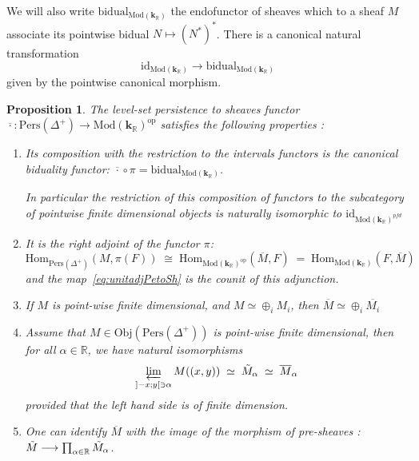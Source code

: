 \documentclass[a4paper, english, 11pt]{article}
\newcommand{\kk}[0]{\textbf{k}}
\newcommand{\Mod}[0]{\text{Mod}}
\newcommand{\Pe}{\text{Pers}}
\newcommand{\0}{\vec{0}}
\newcommand{\R}[0]{\mathbb{R}}
\newcommand{\Obj}[0]{\text{Obj}}
\newcommand{\op}[0]{\text{op}}
\newcommand{\Hom}[0]{\text{Hom}}
\newtheorem{prop}{Proposition}[section]
\begin{document}
We will also write $\text{bidual}_{\Mod(\kk_\R)}$ the endofunctor of  sheaves  which to a sheaf $M$ 
associate its pointwise bidual $N\mapsto (N^*)^*$. There is a canonical natural transformation 
\begin{equation}\label{eq:unitadjPetoSh} \text{id}_{\Mod(\kk_\R)} \to \text{bidual}_{\Mod(\kk_\R)}\end{equation} given by the pointwise canonical morphism.
\begin{prop}\label{P:PropertiesofBar}
The level-set persistence to sheaves functor $\overline{\cdot} : \Pe(\Delta^+)\longrightarrow \Mod (\kk_\R)^{\op}$ satisfies the following properties : 
\begin{enumerate}
    \item Its composition  with the restriction to the intervals functors is the canonical biduality functor: $\overline{\cdot}\circ \pi = \text{bidual}_{\Mod(\kk_\R)}$. 
    
    In particular the restriction of this composition of functors to the subcategory of pointwise finite dimensional objects is naturally isomorphic to $\text{id}_{\Mod(\kk_\R)^{pfd}}$
    \item It is the right adjoint of the functor $\pi$: 
    $$\Hom_{\Pe(\Delta^+)}(M, \pi(F)) \; \cong \; \Hom_{\Mod(\kk_\R)^{\op}}(\overline{M}, F)\; = \; \Hom_{\Mod(\kk_\R)}(F,\overline{M}) $$ and the map~\eqref{eq:unitadjPetoSh} is the counit of this adjunction.
    \item If $M$ is point-wise finite dimensional, and $M \simeq \oplus_i M_i$, then $\overline{M} \simeq \oplus_i \overline{M_i} $
    \item Assume that $M \in \Obj(\Pe(\Delta^{+}))$ is point-wise finite dimensional, then for all $\alpha \in \R$, we have natural isomorphisms  $$ \varprojlim_{]-x;y[\ni \alpha}M((x,y)) \;\simeq\; \tilde{M}_{\alpha}\; \simeq \; \overline{M}_{\alpha}$$ provided that the left hand side is of finite dimension.
    
    \item One can identify $\overline{M}$ with the image of the morphism of pre-sheaves : $\Tilde{M}\longrightarrow \prod_{\alpha\in\R}\Tilde{M}_{\alpha} $.
\end{enumerate}

\end{prop}
\end{document}
